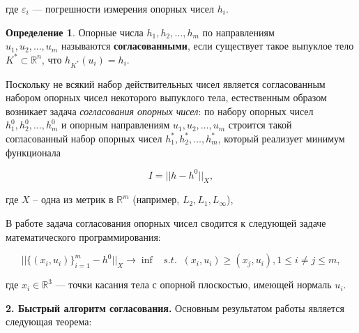 \documentclass[a4paper, 10pt]{article}
\theoremstyle{definition}
\newtheorem{SmartDefinition}{Определение}
\theoremstyle{plain}
\theoremstyle{plain}
\begin{document}
где $\varepsilon_{i}$ --- погрешности измерения опорных чисел $h_{i}$.

\begin{SmartDefinition}
 \label{def:consistency}
 Опорные числа $h_{1}, h_{2}, \ldots, h_{m}$ по направлениям \\
 $u_{1}, u_{2}, \ldots, u_{m}$ называются \textbf{согласованными}, если
 существует такое выпуклое тело  $K^{*} \subset \mathbb{R}^{n}$, что
 $h_{K^{*}}(u_{i}) = h_{i}$.
\end{SmartDefinition}

Поскольку не всякий набор действительных чисел является
согласованным набором опорных чисел некоторого выпуклого тела, естественным
образом возникает задача \textit{согласования опорных чисел}: по набору опорных
чисел $h^{0}_{1}, h^{0}_{2}, \ldots, h^{0}_{m}$ и опорным направлениям
$u_{1}, u_{2}, \ldots, u_{m}$ строится такой согласованный набор опорных чисел
$h^{*}_{1}, h^{*}_{2}, \ldots, h^{*}_{m}$, который реализует минимум функционала

\begin{equation*}
 I = || h - h^{0} ||_{X},
\end{equation*}

где $X$ -- одна из метрик  в $\mathbb{R}^{m}$ (например,
$L_{2}, L_{1}, L_{\infty}$), 

В работе \cite{GardnerKiderlen} задача согласования опорных чисел сводится к
следующей задаче математического программирования:

\begin{equation}
\label{equation:gardner-kiderlen}
 ||\{(x_{i}, u_{i})\}_{i = 1}^{m} - h^{0}||_{X} \to \inf \;\;\; s. t. \;\;
 (x_{i}, u_{i}) \geq (x_{j}, u_{i}), 1 \leq i \neq j \leq m,
\end{equation}

где $x_{i} \in \mathbb{R}^{3}$ --- точки касания тела с опорной плоскостью,
имеющей нормаль $u_{i}$.


\textbf{2. Быстрый алгоритм согласования.}
Основным результатом работы \cite{palachev} является следующая теорема:
\end{document}
